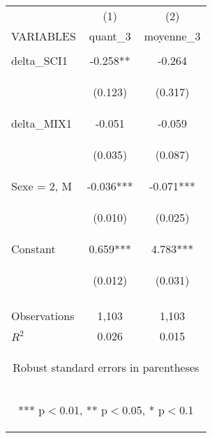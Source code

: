 \begin{center}
\begin{tabular}{lcc} \hline
 & (1) & (2) \\
VARIABLES & quant\_3 & moyenne\_3 \\ \hline
\vspace{4pt} & \begin{footnotesize}\end{footnotesize} & \begin{footnotesize}\end{footnotesize} \\
delta\_SCI1 & -0.258** & -0.264 \\
\vspace{4pt} & \begin{footnotesize}(0.123)\end{footnotesize} & \begin{footnotesize}(0.317)\end{footnotesize} \\
delta\_MIX1 & -0.051 & -0.059 \\
\vspace{4pt} & \begin{footnotesize}(0.035)\end{footnotesize} & \begin{footnotesize}(0.087)\end{footnotesize} \\
Sexe = 2, M & -0.036*** & -0.071*** \\
\vspace{4pt} & \begin{footnotesize}(0.010)\end{footnotesize} & \begin{footnotesize}(0.025)\end{footnotesize} \\
Constant & 0.659*** & 4.783*** \\
 & \begin{footnotesize}(0.012)\end{footnotesize} & \begin{footnotesize}(0.031)\end{footnotesize} \\
\vspace{4pt} & \begin{footnotesize}\end{footnotesize} & \begin{footnotesize}\end{footnotesize} \\
Observations & 1,103 & 1,103 \\
 $R^2$ & 0.026 & 0.015 \\ \hline
\multicolumn{3}{c}{\begin{footnotesize} Robust standard errors in parentheses\end{footnotesize}} \\
\multicolumn{3}{c}{\begin{footnotesize} *** p$<$0.01, ** p$<$0.05, * p$<$0.1\end{footnotesize}} \\
\end{tabular}
\end{center}
